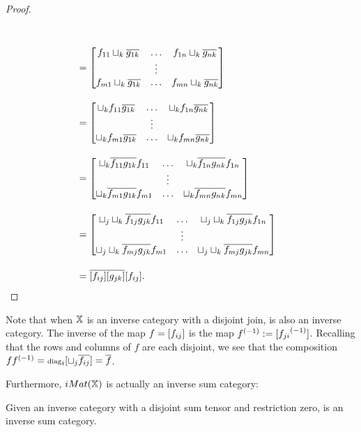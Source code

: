 \begin{proof}
\begin{align*}
        \\[10pt]
      & = \begin{bmatrix}
        f_{11}\djoin_k \rst{g_{1 k}} &\ldots & f_{1n}\djoin_k \rst{g_{n k}} \\
        & \vdots & \\
        f_{m1}\djoin_k \rst{g_{1 k}} &\ldots & f_{m n}\djoin_k \rst{g_{n k}}
      \end{bmatrix}\\[10pt]
      & = \begin{bmatrix}
        \djoin_k f_{11}\rst{g_{1 k}} &\ldots & \djoin_k f_{1n}\rst{g_{n k}} \\
        & \vdots & \\
        \djoin_k f_{m1}\rst{g_{1 k}} &\ldots & \djoin_k f_{m n}\rst{g_{n k}}
      \end{bmatrix}\\[10pt]
      & = \begin{bmatrix}
        \djoin_k \rst{f_{11} g_{1 k}} f_{11} &\ldots & \djoin_k \rst{f_{1n} g_{n k}} f_{1n}\\
        & \vdots & \\
        \djoin_k \rst{f_{m1} g_{1 k}}f_{m1} &\ldots & \djoin_k \rst{f_{m n} g_{n k}}f_{m n}
      \end{bmatrix}\\[10pt]
      & = \begin{bmatrix} %
        \djoin_\jay\djoin_k \rst{f_{1\jay} g_{\jay k}} f_{11} &\ldots &
          \djoin_\jay\djoin_k \rst{f_{1\jay} g_{\jay k}} f_{1n}\\
        & \vdots & \\
        \djoin_\jay\djoin_k \rst{f_{m\jay} g_{\jay k}}f_{m1} &\ldots &
          \djoin_\jay\djoin_k \rst{f_{m \jay} g_{\jay k}}f_{m n}
      \end{bmatrix}\\[10pt]
      &= \rst{[f_{i\jay}][g_{\jay k}]} [f_{i\jay}].
  \end{align*}
\end{proof}

Note that when $\mathbb{X}$ is an inverse category with a disjoint join, \imatx is also an inverse
category. The inverse of the map $f = [f_{ij}]$ is the map ${f}^{(-1)}:=[{f_{j i}}^{(-1)}]$.
Recalling that the rows and columns of $f$ are each disjoint, we see that the composition
$f {f}^{(-1)} = \operatorname{\scriptstyle{diag}}_i [\sqcup_j \overline{f_{ij}}] = \overline{f}$.

Furthermore, $iMat({\mathbb{X}})$ is actually an inverse sum category:
\begin{theorem}\label{thm:imatx_is_an_inverse_sum_category}
  Given \X an inverse category with a disjoint sum tensor and restriction zero, \imatx is
  an inverse sum category.
\end{theorem}

